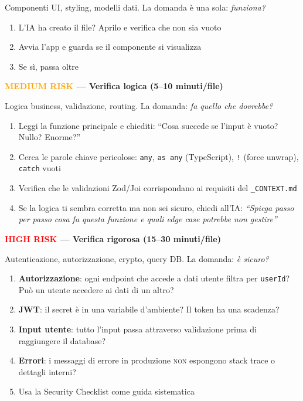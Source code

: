 Componenti UI, styling, modelli dati. La domanda è una sola: \textit{funziona?}

\begin{enumerate}
  \item L'IA ha creato il file? Aprilo e verifica che non sia vuoto
  \item Avvia l'app e guarda se il componente si visualizza
  \item Se sì, passa oltre
\end{enumerate}

\textbf{\textcolor{orange}{MEDIUM RISK} --- Verifica logica (5--10 minuti/file)}

Logica business, validazione, routing. La domanda: \textit{fa quello che dovrebbe?}

\begin{enumerate}
  \item Leggi la funzione principale e chiediti: ``Cosa succede se l'input è vuoto? Nullo? Enorme?''
  \item Cerca le parole chiave pericolose: \texttt{any}, \texttt{as any} (TypeScript), \texttt{!} (force unwrap), \texttt{catch} vuoti
  \item Verifica che le validazioni Zod/Joi corrispondano ai requisiti del \texttt{\_CONTEXT.md}
  \item Se la logica ti sembra corretta ma non sei sicuro, chiedi all'IA: \textit{``Spiega passo per passo cosa fa questa funzione e quali edge case potrebbe non gestire''}
\end{enumerate}

\textbf{\textcolor{red}{HIGH RISK} --- Verifica rigorosa (15--30 minuti/file)}

Autenticazione, autorizzazione, crypto, query DB. La domanda: \textit{è sicuro?}

\begin{enumerate}
  \item \textbf{Autorizzazione}: ogni endpoint che accede a dati utente filtra per \texttt{userId}? Può un utente accedere ai dati di un altro?
  \item \textbf{JWT}: il secret è in una variabile d'ambiente? Il token ha una scadenza?
  \item \textbf{Input utente}: tutto l'input passa attraverso validazione prima di raggiungere il database?
  \item \textbf{Errori}: i messaggi di errore in produzione \textsc{non} espongono stack trace o dettagli interni?
  \item Usa la Security Checklist come guida sistematica
\end{enumerate}


